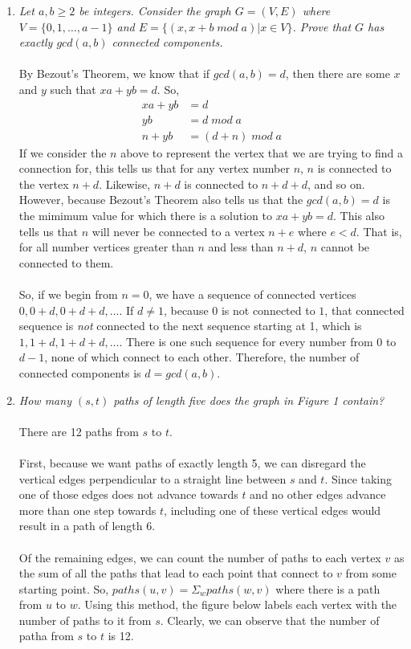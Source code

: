 \documentclass[a4paper]{article}
\begin{document}
\begin{enumerate}
\item \emph{Let $a,b \geq 2$ be integers. Consider the graph $G = (V,E)$ where $V = \{0,1,\dots, a-1\}$ and $E = \{(x,x+b\;mod\;a)|x \in V\}$. Prove that $G$ has exactly $gcd(a,b)$ connected components.} \\
\\
By Bezout's Theorem, we know that if $gcd(a, b) = d$, then there are some $x$ and $y$ such that $xa+yb = d$. So,
\begin{align*}
xa+yb &=d \\
yb &= d\; mod\; a \\
n + yb &= (d+n)\; mod\; a
\end{align*}
If we consider the $n$ above to represent the vertex that we are trying to find a connection for, this tells us that for any vertex number $n$, $n$ is connected to the vertex $n+d$. Likewise, $n+d$ is connected to $n+d+d$, and so on. However, because Bezout's Theorem also tells us that the $gcd(a, b)=d$ is the mimimum value for which there is a solution to $xa+yb =d$. This also tells us that $n$ will never be connected to a vertex $n+e$ where $e < d$. That is, for all number vertices greater than $n$ and less than $n+d$, $n$ cannot be connected to them. \\
\\
So, if we begin from $n = 0$, we have a sequence of connected vertices $0, 0+d,0+d+d, \dots$. If $d \neq 1$, because $0$ is not connected to $1$, that connected sequence is \emph{not} connected to the next sequence starting at 1, which is $1,1+d,1+d+d,\dots$. There is one such sequence for every number from $0$ to $d-1$, none of which connect to each other. Therefore, the number of connected components is $d = gcd(a,b)$. \\



\item \emph{How many $(s, t)$ paths of length five does the graph in Figure 1 contain?} \\
\\
There are 12 paths from $s$ to $t$. \\
\\
First, because we want paths of exactly length 5, we can disregard the vertical edges perpendicular to a straight line between $s$ and $t$. Since taking one of those edges does not advance towards $t$ and no other edges advance more than one step towards $t$, including one of these vertical edges would result in a path of length 6. \\
\\
Of the remaining edges, we can count the number of paths to each vertex $v$ as the sum of all the paths that lead to each point that connect to $v$ from some starting point. So, $paths(u,v) = \Sigma_w paths(w, v)$ where there is a path from $u$ to $w$. Using this method, the figure below labels each vertex with the number of paths to it from $s$. Clearly, we can observe that the number of patha from $s$ to $t$ is 12.\\


\end{enumerate}
\end{document}

